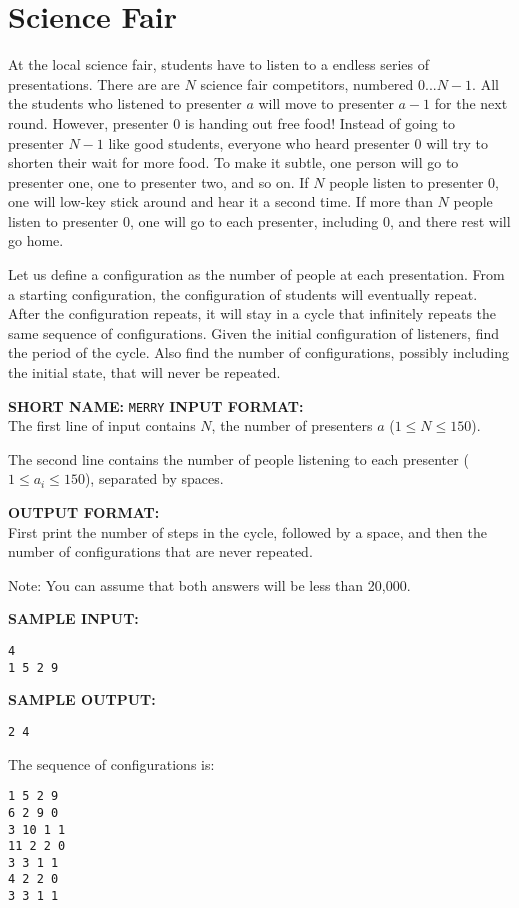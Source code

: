 \documentclass[twoside]{article}
\newcommand{\blank}{\vskip 3mm}
\begin{document}



\section{Science Fair}

At the local science fair, students have to listen to a endless series of presentations.  There are are $N$ science fair competitors, numbered 0...$N-1$.  All the students who listened to presenter $a$ will move to presenter $a-1$ for the next round.  However, presenter $0$ is handing out free food!  Instead of going to presenter $N-1$ like good students, everyone who heard presenter $0$ will try to shorten their wait for more food.  To make it subtle, one person will go to presenter one, one to presenter two, and so on.  If $N$ people listen to presenter $0$, one will low-key stick around and hear it a second time.  If more than $N$ people listen to presenter $0$, one will go to each presenter, including $0$, and there rest will go home.

Let us define a configuration as the number of people at each presentation.  From a starting configuration, the configuration of students will eventually repeat.  After the configuration repeats, it will stay in a cycle that infinitely repeats the same sequence of configurations.  Given the initial configuration of listeners, find the period of the cycle.  Also find the number of configurations, possibly including the initial state, that will never be repeated.  


\textbf{SHORT NAME:} \verb|MERRY|
\blank
\textbf{INPUT FORMAT:}\\
The first line of input contains $N$, the number of presenters $a$ ($1 \leq N \leq 150$).

The second line contains the number of people listening to each presenter ($1 \leq a_i \leq 150$), separated by spaces.


\blank
\textbf{OUTPUT FORMAT:}\\
First print the number of steps in the cycle, followed by a space, and then the number of configurations that are never repeated.

Note: You can assume that both answers will be less than 20,000.

\blank
\textbf{SAMPLE INPUT:}
\begin{verbatim}
4
1 5 2 9
\end{verbatim}


\textbf{SAMPLE OUTPUT:}
\begin{verbatim}
2 4
\end{verbatim}

The sequence of configurations is:
\begin{verbatim}
1 5 2 9 
6 2 9 0
3 10 1 1
11 2 2 0
3 3 1 1
4 2 2 0
3 3 1 1
\end{verbatim}
\end{document}
